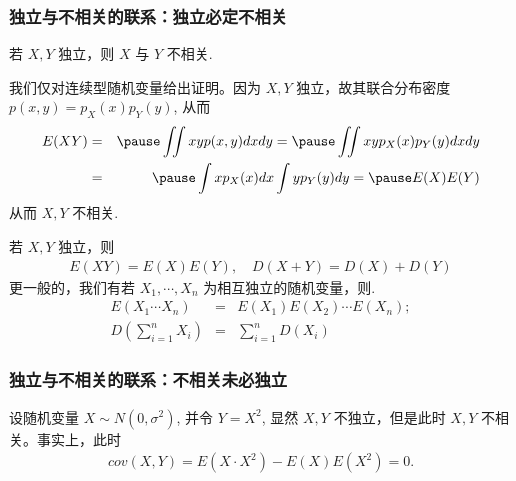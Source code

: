 \begin{frame}
	\frametitle{独立与不相关的联系：独立必定不相关}
	\vspace{-0.2cm}
	\begin{thm}
		若 $X,Y$ 独立，则 $X$ 与 $Y$ 不相关.
	\end{thm}

	\zheng 我们仅对连续型随机变量给出证明。因为 $X,Y$ 独立，故其联合分布密度 $p (x,y)=p_X (x) p_Y (y)$, 从而
	\begin{eqnarray*}
		E(XY)&=&\pause \iint xyp(x,y)dxdy=\pause \iint xyp_X(x)p_Y(y)dxdy\\
		&=&\pause \int xp_X(x)dx\int yp_Y(y)dy =\pause E(X)E(Y)
	\end{eqnarray*}
	\pause 从而 $X,Y$ 不相关.
	\pause
	\begin{thm}
		若 $X,Y$ 独立，则
		\begin{eqnarray*}
			E(XY)=E(X)E(Y),\quad
			D(X+Y)=D(X)+D(Y)
		\end{eqnarray*}
		更一般的，我们有若 $X_1,\cdots,X_n$ 为相互独立的随机变量，则.
		\begin{eqnarray*}
			E(X_1\cdots X_n)&=&E(X_1)E(X_2)\cdots E(X_n);\\
			D(\sum_{i=1}^nX_i)&=&\sum_{i=1}^nD(X_i)
		\end{eqnarray*}
	\end{thm}

\end{frame}
\begin{frame}
	\frametitle{独立与不相关的联系：不相关未必独立}
	\begin{exam}
		设随机变量 $X\sim N (0,\sigma^2)$, 并令 $Y=X^2$, 显然 $X,Y$ 不独立，但是此时 $X,Y$ 不相关。事实上，此时
		\begin{eqnarray*}
			cov(X,Y)=E(X\cdot X^2)-E(X)E(X^2)=0.
		\end{eqnarray*}

	\end{exam}

\end{frame}
